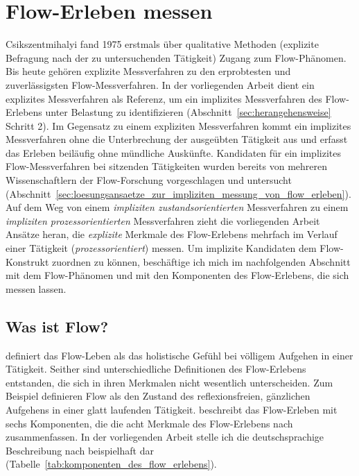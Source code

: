 \chapter{Flow-Erleben messen} %
\label{cha:flow_erleben_messen}

Csikszentmihalyi fand 1975 erstmals über qualitative Methoden (explizite Befragung nach der zu untersuchenden Tätigkeit) Zugang zum Flow-Phänomen. Bis heute gehören explizite Messverfahren zu den erprobtesten und zuverlässigsten Flow-Messverfahren. In der vorliegenden Arbeit dient ein explizites Messverfahren als Referenz, um ein implizites Messverfahren des Flow-Erlebens unter Belastung zu identifizieren (Abschnitt~\ref{sec:herangehensweise} Schritt 2). Im Gegensatz zu einem expliziten Messverfahren kommt ein implizites Messverfahren ohne die Unterbrechung der ausgeübten Tätigkeit aus und erfasst das Erleben beiläufig ohne mündliche Auskünfte. Kandidaten für ein implizites Flow-Messverfahren bei sitzenden Tätigkeiten wurden bereits von mehreren Wissenschaftlern der Flow-Forschung vorgeschlagen und untersucht (Abschnitt~\ref{sec:loesungsansaetze_zur_impliziten_messung_von_flow_erleben}). Auf dem Weg von einem \emph{impliziten zustandsorientierten} Messverfahren zu einem \emph{impliziten prozessorientierten} Messverfahren zieht die vorliegenden Arbeit Ansätze heran, die \emph{explizite} Merkmale des Flow-Erlebens mehrfach im Verlauf einer Tätigkeit (\emph{prozessorientiert}) messen. Um implizite Kandidaten dem Flow-Konstrukt zuordnen zu können, beschäftige ich mich im nachfolgenden Abschnitt mit dem Flow-Phänomen und mit den Komponenten des Flow-Erlebens, die sich messen lassen.

\section{Was ist Flow?} %
\label{sec:was_ist_flow}

\citet[S.~58f.]{Csikszentmihalyi2010} definiert das Flow-Leben als das holistische Gefühl bei völligem Aufgehen in einer Tätigkeit. Seither sind unterschiedliche Definitionen des Flow-Erlebens entstanden, die sich in ihren Merkmalen nicht wesentlich unterscheiden. Zum Beispiel definieren \citet[][S.~263]{Rheinberg2003} Flow als den Zustand des reflexionsfreien, gänzlichen Aufgehens in einer glatt laufenden Tätigkeit. \citep[S.~153ff.]{Rheinberg2008} beschreibt das Flow-Erleben mit sechs Komponenten, die die acht Merkmale des Flow-Erlebens nach \citet[S.~108ff.]{Csikszentmihalyi2010} zusammenfassen. In der vorliegenden Arbeit stelle ich die deutschsprachige Beschreibung nach \citep[]{Rheinberg2008}  beispielhaft dar (Tabelle~\ref{tab:komponenten_des_flow_erlebens}). 


